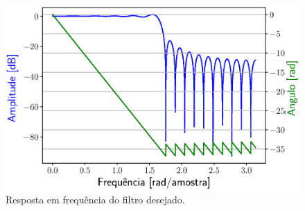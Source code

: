 \documentclass{homeworkclass}
\begin{document}
\begin{homeworkProblem}
\begin{homeworkSection}
\begin{figure}[!ht]
	\centering
	\includegraphics[width=0.6\linewidth]{figs/freq}
	\caption{Resposta em frequência do filtro desejado.}
	\label{fig:freq}
\end{figure}

\end{homeworkSection}



\end{homeworkProblem}
\end{document}
